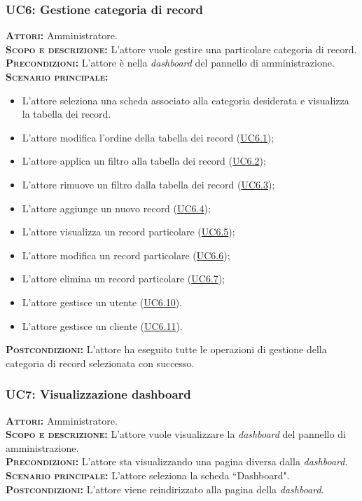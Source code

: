 \subsubsection{UC6: Gestione categoria di record}
\label{sec:UC6}
\textsc{\textbf{Attori:}} Amministratore.\\
\textsc{\textbf{Scopo e descrizione:}} L'attore vuole gestire una particolare categoria di record.\\
\textsc{\textsc{\textbf{Precondizioni:}}} L'attore è nella \textit{dashboard} del pannello di amministrazione.\\
\textsc{\textbf{Scenario principale:}} 
\begin{itemize}
    \item L'attore seleziona una scheda associato alla categoria desiderata e visualizza la tabella dei record.
    \item L'attore modifica l'ordine della tabella dei record (\hyperref[sec:UC61]{UC6.1});
    \item L'attore applica un filtro alla tabella dei record (\hyperref[sec:UC62]{UC6.2});
    \item L'attore rimuove un filtro dalla tabella dei record (\hyperref[sec:UC63]{UC6.3});
    \item L'attore aggiunge un nuovo record (\hyperref[sec:UC64]{UC6.4});
    \item L'attore visualizza un record particolare (\hyperref[sec:UC65]{UC6.5});
    \item L'attore modifica un record particolare (\hyperref[sec:UC66]{UC6.6});
    \item L'attore elimina un record particolare (\hyperref[sec:UC67]{UC6.7});
    \item L'attore gestisce un utente (\hyperref[sec:UC610]{UC6.10}).
    \item L'attore gestisce un cliente (\hyperref[sec:UC611]{UC6.11}).
\end{itemize}
\textsc{\textbf{Postcondizioni:}} L'attore ha eseguito tutte le operazioni di gestione della categoria di record selezionata con successo.

\subsubsection{UC7: Visualizzazione dashboard}
\label{sec:UC7}
\textsc{\textbf{Attori:}} Amministratore.\\
\textsc{\textbf{Scopo e descrizione:}} L'attore vuole visualizzare la \textit{dashboard} del pannello di amministrazione.\\
\textsc{\textsc{\textbf{Precondizioni:}}} L'attore sta visualizzando una pagina diversa dalla \textit{dashboard}.\\
\textsc{\textbf{Scenario principale:}} L'attore seleziona la scheda ``Dashboard".\\
\textsc{\textbf{Postcondizioni:}} L'attore viene reindirizzato alla pagina della \textit{dashboard}.

